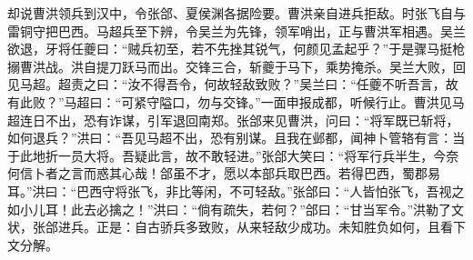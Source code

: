 却说曹洪领兵到汉中，令张郃、夏侯渊各据险要。曹洪亲自进兵拒敌。时张飞自与雷铜守把巴西。马超兵至下辨，令吴兰为先锋，领军哨出，正与曹洪军相遇。吴兰欲退，牙将任夔曰：“贼兵初至，若不先挫其锐气，何颜见孟起乎？”于是骤马挺枪搦曹洪战。洪自提刀跃马而出。交锋三合，斩夔于马下，乘势掩杀。吴兰大败，回见马超。超责之曰：“汝不得吾令，何故轻敌致败？”吴兰曰：“任夔不听吾言，故有此败？”马超曰：“可紧守隘口，勿与交锋。”一面申报成都，听候行止。曹洪见马超连日不出，恐有诈谋，引军退回南郑。张郃来见曹洪，问曰：“将军既已斩将，如何退兵？”洪曰：“吾见马超不出，恐有别谋。且我在邺都，闻神卜管辂有言：当于此地折一员大将。吾疑此言，故不敢轻进。”张郃大笑曰：“将军行兵半生，今奈何信卜者之言而惑其心哉！郃虽不才，愿以本部兵取巴西。若得巴西，蜀郡易耳。”洪曰：“巴西守将张飞，非比等闲，不可轻敌。”张郃曰：“人皆怕张飞，吾视之如小儿耳！此去必擒之！”洪曰：“倘有疏失，若何？”郃曰：“甘当军令。”洪勒了文状，张郃进兵。正是：自古骄兵多致败，从来轻敌少成功。未知胜负如何，且看下文分解。